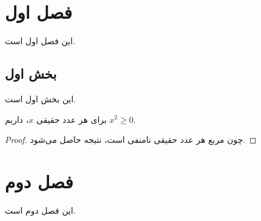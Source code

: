 \documentclass{matinbook}
\begin{document}
\tableofcontents
\clearpage

\listoffigures
\clearpage

\listoftables
\clearpage

\mainmatter

\chapter{فصل اول}
\label{chap:first}

این فصل اول است.

\section{بخش اول}
\label{sec:first-section}

این بخش اول است.

\begin{theorem}
    برای هر عدد حقیقی $x$، داریم $x^2 \geq 0$.
\end{theorem}

\begin{proof}
    چون مربع هر عدد حقیقی نامنفی است، نتیجه حاصل می‌شود.
\end{proof}

\chapter{فصل دوم}
\label{chap:second}

این فصل دوم است.

\backmatter

\printbibliography[title={منابع و مراجع}]

\printindex

\end{document}
